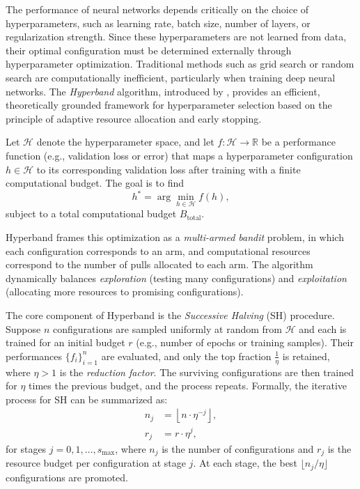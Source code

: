 The performance of neural networks depends critically on the choice of hyperparameters, such as learning rate, batch size, number of layers, or regularization strength. Since these hyperparameters are not learned from data, their optimal configuration must be determined externally through hyperparameter optimization. Traditional methods such as grid search or random search are computationally inefficient, particularly when training deep neural networks. The \textit{Hyperband} algorithm, introduced by \textcite{li2017hyperband}, provides an efficient, theoretically grounded framework for hyperparameter selection based on the principle of adaptive resource allocation and early stopping.

Let $\mathcal{H}$ denote the hyperparameter space, and let $f : \mathcal{H} \rightarrow \mathbb{R}$ be a performance function (e.g., validation loss or error) that maps a hyperparameter configuration $h \in \mathcal{H}$ to its corresponding validation loss after training with a finite computational budget. The goal is to find
\begin{equation}
	h^* = \arg\min_{h \in \mathcal{H}} f(h),
	\label{eq:hyperband_objective}
\end{equation}
subject to a total computational budget $B_{\text{total}}$.

Hyperband frames this optimization as a \emph{multi-armed bandit} problem, in which each configuration corresponds to an arm, and computational resources correspond to the number of pulls allocated to each arm. The algorithm dynamically balances \textit{exploration} (testing many configurations) and \textit{exploitation} (allocating more resources to promising configurations).

The core component of Hyperband is the \textit{Successive Halving} (SH) procedure. Suppose $n$ configurations are sampled uniformly at random from $\mathcal{H}$ and each is trained for an initial budget $r$ (e.g., number of epochs or training samples). Their performances $\{f_i\}_{i=1}^{n}$ are evaluated, and only the top fraction $\frac{1}{\eta}$ is retained, where $\eta > 1$ is the \textit{reduction factor}. The surviving configurations are then trained for $\eta$ times the previous budget, and the process repeats. Formally, the iterative process for SH can be summarized as:
\begin{align}
	n_j & = \left\lfloor n \cdot \eta^{-j} \right\rfloor, \\
	r_j & = r \cdot \eta^{j},
	\label{eq:successive_halving}
\end{align}
for stages $j = 0, 1, \ldots, s_{\max}$, where $n_j$ is the number of configurations and $r_j$ is the resource budget per configuration at stage $j$. At each stage, the best $\lfloor n_j / \eta \rfloor$ configurations are promoted.

